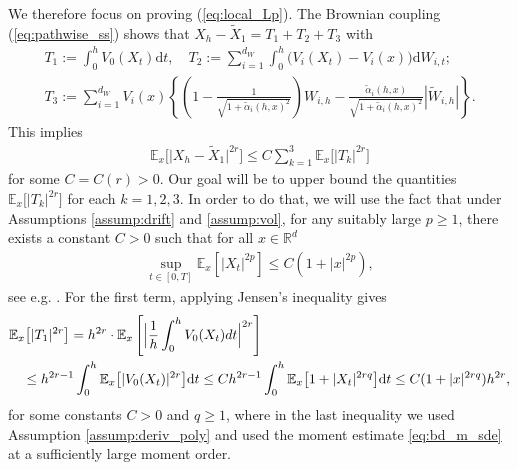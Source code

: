 \documentclass[11pt]{article}
\renewcommand{\d}{\mathrm{d}}
\begin{document}
We therefore focus on proving (\ref{eq:local_Lp}). The Brownian coupling (\ref{eq:pathwise_ss}) shows that $X_h - \widetilde{X}_1 =  T_1 + T_2 + T_3$ with 
% 
% 
% 
\begin{gather*}
T_1 := \int_0^h V_0 (X_t) \d t, \quad 
T_2 := \sum_{i = 1}^{d_W} \int_0^h \bigl( V_{i} (X_t) -  V_{i} (x) \bigr) \d W_{i, t}; \\ 
T_3 := \sum_{i = 1}^{d_W} V_{i} (x) \left\{  \left( 1 -  \frac{1}{\sqrt{1 + \tilde{\alpha}_i (h, x)^2}} \right) W_{i, h} 
- \frac{\tilde{\alpha}_i (h, x)}{\sqrt{1 + \tilde{\alpha}_i (h, x)^2}} | \widetilde{W}_{i, h} |  \right\}. 
\end{gather*} 
% 
This implies
% 
\begin{align*}
\mathbb{E}_x \bigl[ \bigl| X_h - \widetilde{X}_1  \bigr|^{2r} \bigr] 
\le C \sum_{k = 1}^3 \mathbb{E}_x \bigl[ | T_k |^{2r} \bigr] 
\end{align*}
%  
for some $C = C(r) > 0$. Our goal will be to upper bound the quantities $\mathbb{E}_x \bigl[ | T_k |^{2r} \bigr]$ for each $k = 1, 2, 3$. In order to do that, we will use the fact that under Assumptions \ref{assump:drift} and \ref{assump:vol}, for any suitably large $p \ge 1$, there exists a constant $C>0$ such that for all $x \in \mathbb{R}^d$
\begin{align} \label{eq:bd_m_sde}
\sup_{t \in [0, T]}  \mathbb{E}_x [ |X_t|^{2p}] 
\le C ( 1 + |x|^{2p}),
\end{align} 
% 
%
see e.g. \cite{Tret:13}. For the first term, applying Jensen's inequality gives
% 
\begin{align*}
& \mathbb{E}_x \bigl[ | T_1 |^{2r} \bigr] 
 = h^{2r} \cdot \mathbb{E}_x \left[ \Bigl| \frac{1}{h} \int_0^h V_0  (X_t) dt \Bigr|^{2r} \right] \\
& \quad 
\le  h^{2r - 1} \int_0^h \mathbb{E}_x \bigl[ | V_0  (X_t) |^{2r} \bigr]  \d t 
\le C  h^{2r - 1} \int_0^h \mathbb{E}_x \bigl[ 1 + |X_t|^{2 r q} \bigr]  \d t
\le C(1 + |x|^{2rq}) h^{2r}, 
\nonumber 
\end{align*}
% 
for some constants $C > 0$ and $q \ge 1$, where in the last inequality we used Assumption \ref{assump:deriv_poly} and used the moment estimate \eqref{eq:bd_m_sde} at a sufficiently large moment order. 
\end{document}
